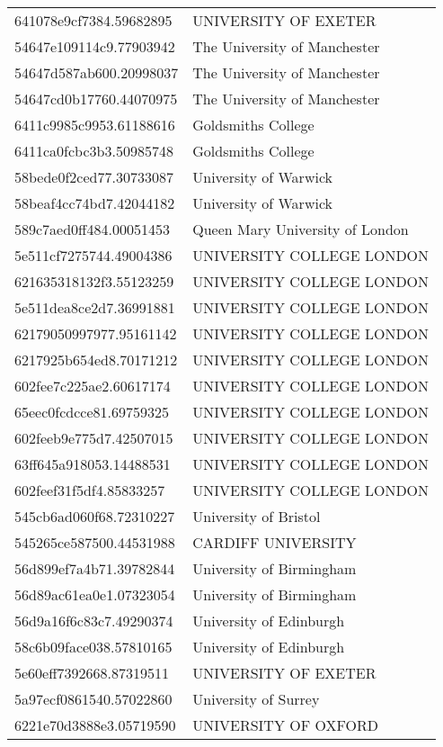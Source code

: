 \begin{tabular}{ll}
641078e9cf7384.59682895 & UNIVERSITY OF EXETER \\
54647e109114c9.77903942 & The University of Manchester \\
54647d587ab600.20998037 & The University of Manchester \\
54647cd0b17760.44070975 & The University of Manchester \\
6411c9985c9953.61188616 & Goldsmiths College \\
6411ca0fcbc3b3.50985748 & Goldsmiths College \\
58bede0f2ced77.30733087 & University of Warwick \\
58beaf4cc74bd7.42044182 & University of Warwick \\
589c7aed0ff484.00051453 & Queen Mary University of London \\
5e511cf7275744.49004386 & UNIVERSITY COLLEGE LONDON \\
621635318132f3.55123259 & UNIVERSITY COLLEGE LONDON \\
5e511dea8ce2d7.36991881 & UNIVERSITY COLLEGE LONDON \\
62179050997977.95161142 & UNIVERSITY COLLEGE LONDON \\
6217925b654ed8.70171212 & UNIVERSITY COLLEGE LONDON \\
602fee7c225ae2.60617174 & UNIVERSITY COLLEGE LONDON \\
65eec0fcdcce81.69759325 & UNIVERSITY COLLEGE LONDON \\
602feeb9e775d7.42507015 & UNIVERSITY COLLEGE LONDON \\
63ff645a918053.14488531 & UNIVERSITY COLLEGE LONDON \\
602feef31f5df4.85833257 & UNIVERSITY COLLEGE LONDON \\
545cb6ad060f68.72310227 & University of Bristol \\
545265ce587500.44531988 & CARDIFF UNIVERSITY \\
56d899ef7a4b71.39782844 & University of Birmingham \\
56d89ac61ea0e1.07323054 & University of Birmingham \\
56d9a16f6c83c7.49290374 & University of Edinburgh \\
58c6b09face038.57810165 & University of Edinburgh \\
5e60eff7392668.87319511 & UNIVERSITY OF EXETER \\
5a97ecf0861540.57022860 & University of Surrey \\
6221e70d3888e3.05719590 & UNIVERSITY OF OXFORD \\

\end{tabular}
